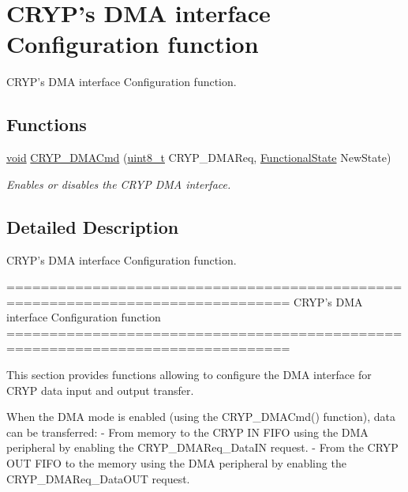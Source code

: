 \hypertarget{group___c_r_y_p___group4}{\section{C\-R\-Y\-P's D\-M\-A interface Configuration function}
\label{group___c_r_y_p___group4}
}


C\-R\-Y\-P's D\-M\-A interface Configuration function.  


\subsection*{Functions}
\begin{DoxyCompactItemize}
\item 
\hyperlink{group___n_a_m_e_ga18028b8badbf1ea7e704ccac3c488e82}{void} \hyperlink{group___c_r_y_p___group4_ga111d0ec56facb27f8367ce6a33869115}{C\-R\-Y\-P\-\_\-\-D\-M\-A\-Cmd} (\hyperlink{stdint_8h_aba7bc1797add20fe3efdf37ced1182c5}{uint8\-\_\-t} C\-R\-Y\-P\-\_\-\-D\-M\-A\-Req, \hyperlink{group___exported__types_gac9a7e9a35d2513ec15c3b537aaa4fba1}{Functional\-State} New\-State)
\begin{DoxyCompactList}\small\item\em Enables or disables the C\-R\-Y\-P D\-M\-A interface. \end{DoxyCompactList}\end{DoxyCompactItemize}


\subsection{Detailed Description}
C\-R\-Y\-P's D\-M\-A interface Configuration function. \begin{DoxyVerb} ===============================================================================
                   CRYP's DMA interface Configuration function
 ===============================================================================  

  This section provides functions allowing to configure the DMA interface for 
  CRYP data input and output transfer.
   
  When the DMA mode is enabled (using the CRYP_DMACmd() function), data can be 
  transferred:
  - From memory to the CRYP IN FIFO using the DMA peripheral by enabling 
    the CRYP_DMAReq_DataIN request.
  - From the CRYP OUT FIFO to the memory using the DMA peripheral by enabling 
    the CRYP_DMAReq_DataOUT request.\end{DoxyVerb}
 

